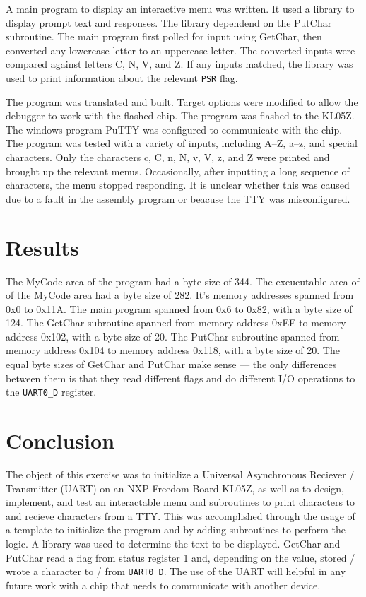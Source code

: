 \documentclass[CMPE]{KGCOEReport}
\begin{document}
A main program to display an interactive menu was written. It used a library to
display prompt text and responses. The library dependend on the PutChar
subroutine. The main program first polled for input using GetChar, then
converted any lowercase letter to an uppercase letter. The converted inputs
were compared against letters C, N, V, and Z. If any inputs matched, the
library was used to print information about the relevant \texttt{PSR} flag.

The program was translated and built. Target options were modified to allow the
debugger to work with the flashed chip. The program was flashed to the KL05Z.
The windows program PuTTY was configured to communicate with the chip. The
program was tested with a variety of inputs, including A--Z, a--z, and special
characters. Only the characters c, C, n, N, v, V, z, and Z were printed and
brought up the relevant menus. Occasionally, after inputting a long sequence of
characters, the menu stopped responding. It is unclear whether this was caused
due to a fault in the assembly program or beacuse the TTY was misconfigured.

\section*{Results}

The MyCode area of the program had a byte size of 344. The exeucutable area of
of the MyCode area had a byte size of 282. It's memory addresses spanned from
0x0 to 0x11A. The main program spanned from 0x6 to 0x82, with a byte size of
124. The GetChar subroutine spanned from memory address 0xEE to memory address
0x102, with a byte size of 20. The PutChar subroutine spanned from memory
address 0x104 to memory address 0x118, with a byte size of 20. The equal byte
sizes of GetChar and PutChar make sense — the only differences between them is
that they read different flags and do different I/O operations to the
\texttt{UART0\_D} register.

\section*{Conclusion}


The object of this exercise was to initialize a Universal Asynchronous
Reciever / Transmitter (UART) on an NXP Freedom Board KL05Z, as well as to
design, implement, and test an interactable menu and subroutines to print
characters to and recieve characters from a TTY. This was accomplished through
the usage of a template to initialize the program and by adding subroutines to
perform the logic. A library was used to determine the text to be displayed.
GetChar and PutChar read a flag from status register 1 and, depending on the
value, stored / wrote a character to / from \texttt{UART0\_D}. The use of the
UART will helpful in any future work with a chip that needs to communicate with
another device.


\end{document}
